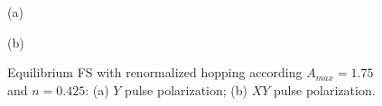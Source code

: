 \begin{figure}[h!]
\begin{minipage}[h]{0.5\linewidth}
 (a) \\
\end{minipage}
\hfill
\begin{minipage}[h]{0.5\linewidth}
 (b) \\
\end{minipage}
\caption{Equilibrium FS with renormalized hopping according $A_{max}=1.75$ and $n=0.425$: (a) $Y$ pulse polarization; (b) $XY$ pulse polarization.}
\label{fig:FS_equilibrium_t_tp}
\end{figure}

